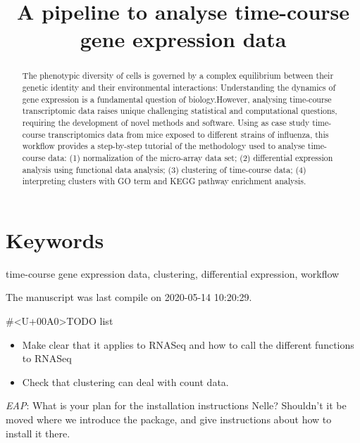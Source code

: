 \documentclass[9pt,a4paper,]{extarticle}
\begin{document}
\pagestyle{front}

\title{A pipeline to analyse time-course gene expression data}


\maketitle
\thispagestyle{front}

\begin{abstract}
The phenotypic diversity of cells is governed by a complex equilibrium between their genetic identity and their environmental interactions: Understanding the dynamics of gene expression is a fundamental question of biology.However, analysing time-course transcriptomic data raises unique challenging statistical and computational questions, requiring the development of novel methods and software. Using as case study time-course transcriptomics data from mice exposed to different strains of influenza, this workflow provides a step-by-step tutorial of the methodology used to analyse time-course data: (1) normalization of the micro-array data set; (2) differential expression analysis using functional data analysis; (3) clustering of time-course data; (4) interpreting clusters with GO term and KEGG pathway enrichment analysis.
\end{abstract}

\section*{Keywords}
time-course gene expression data, clustering, differential expression, workflow


\clearpage
\pagestyle{main}

The manuscript was last compile on 2020-05-14 10:20:29.

\#\textless{}U+00A0\textgreater{}TODO list

\begin{itemize}
\tightlist
\item
  Make clear that it applies to RNASeq and how to call the different functions
  to RNASeq
\item
  Check that clustering can deal with count data.
\end{itemize}

\emph{EAP}: What is your plan for the installation instructions Nelle? Shouldn't it be moved where we introduce the package, and give instructions about how to install it there.
\end{document}
